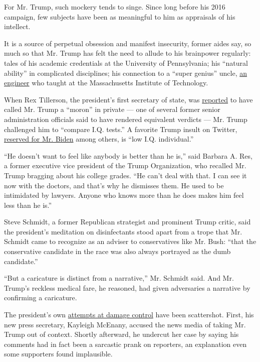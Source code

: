 For Mr. Trump, such mockery tends to singe. Since long before his 2016
campaign, few subjects have been as meaningful to him as appraisals of
his intellect.

It is a source of perpetual obsession and manifest insecurity, former
aides say, so much so that Mr. Trump has felt the need to allude to his
brainpower regularly: tales of his academic credentials at the
University of Pennsylvania; his ``natural ability'' in complicated
disciplines; his connection to a ``super genius'' uncle,
\href{https://www.nytimes.com/1985/02/26/us/john-trump-dies-engineer-was-78.html}{an
engineer} who taught at the Massachusetts Institute of Technology.

When Rex Tillerson, the president's first secretary of state, was
\href{https://www.nbcnews.com/politics/white-house/tillerson-s-fury-trump-required-intervention-pence-n806451}{reported}
to have called Mr. Trump a ``moron'' in private --- one of several
former senior administration officials said to have rendered equivalent
verdicts --- Mr. Trump challenged him to ``compare I.Q. tests.'' A
favorite Trump insult on Twitter,
\href{https://twitter.com/realDonaldTrump/status/1107631297076305920}{reserved
for Mr. Biden} among others, is ``low I.Q. individual.''

``He doesn't want to feel like anybody is better than he is,'' said
Barbara A. Res, a former executive vice president of the Trump
Organization, who recalled Mr. Trump bragging about his college grades.
``He can't deal with that. I can see it now with the doctors, and that's
why he dismisses them. He used to be intimidated by lawyers. Anyone who
knows more than he does makes him feel less than he is.''

Steve Schmidt, a former Republican strategist and prominent Trump
critic, said the president's meditation on disinfectants stood apart
from a trope that Mr. Schmidt came to recognize as an adviser to
conservatives like Mr. Bush: ``that the conservative candidate in the
race was also always portrayed as the dumb candidate.''

``But a caricature is distinct from a narrative,'' Mr. Schmidt said. And
Mr. Trump's reckless medical fare, he reasoned, had given adversaries a
narrative by confirming a caricature.

The president's own
\href{https://www.nytimes.com/2020/04/24/us/politics/trump-inject-disinfectant-bleach-coronavirus.html}{attempts
at damage control} have been scattershot. First, his new press
secretary, Kayleigh McEnany, accused the news media of taking Mr. Trump
out of context. Shortly afterward, he undercut her case by saying his
comments had in fact been a sarcastic prank on reporters, an explanation
even some supporters found implausible.

